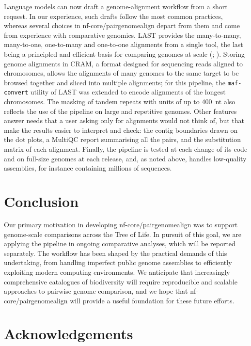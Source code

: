 \documentclass[PCJ,Unicode,screen]{cedram}
\begin{document}
Language models can now draft a genome-alignment workflow from a short request. In our experience, such drafts follow the most common practices, whereas several choices in nf-core/pairgenomealign depart from them and come from experience with comparative genomics. LAST provides the many-to-many, many-to-one, one-to-many and one-to-one alignments from a single tool, the last being a principled and efficient basis for comparing genomes at scale (\cite{Frith_2015}; \cite{Plessy_2024}). Storing genome alignments in CRAM, a format designed for sequencing reads aligned to chromosomes, allows the alignments of many genomes to the same target to be browsed together and sliced into multiple alignments; for this pipeline, the \texttt{maf-convert} utility of LAST was extended to encode alignments of the longest chromosomes. The masking of tandem repeats with units of up to 400~nt also reflects the use of the pipeline on large and repetitive genomes. Other features answer needs that a user asking only for alignments would not think of, but that make the results easier to interpret and check: the contig boundaries drawn on the dot plots, a MultiQC report summarising all the pairs, and the substitution matrix of each alignment. Finally, the pipeline is tested at each change of its code and on full-size genomes at each release, and, as noted above, handles low-quality assemblies, for instance containing millions of sequences.

\section*{Conclusion}

Our primary motivation in developing nf-core/pairgenomealign was to support genome-scale comparisons across the Tree of Life. In pursuit of this goal, we are applying the pipeline in ongoing comparative analyses, which will be reported separately. The workflow has been shaped by the practical demands of this undertaking, from handling imperfect public genome assemblies to efficiently exploiting modern computing environments. We anticipate that increasingly comprehensive catalogues of biodiversity will require reproducible and scalable approaches to pairwise genome comparison, and we hope that nf-core/pairgenomealign will provide a useful foundation for these future efforts.

\section*{Acknowledgements}
\end{document}
